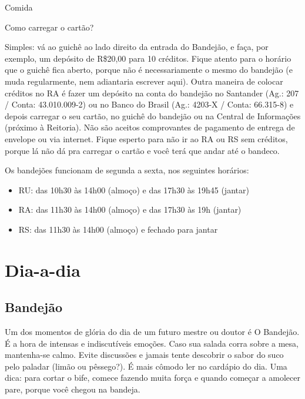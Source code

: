 
\begin{story}{Comida}

\begin{sidebar}{Como carregar o cartão?}

Simples: vá ao guichê ao lado direito da entrada do Bandejão, e faça, por exemplo, um depósito de R\$20,00 para 10 créditos. Fique atento para o horário que o guichê fica aberto, porque não é necessariamente o mesmo do bandejão (e muda regularmente, nem adiantaria escrever aqui). Outra maneira de colocar créditos no RA é fazer um depósito na conta do bandejão no Santander (Ag.: 207 / Conta: 43.010.009-2) ou no Banco do Brasil (Ag.: 4203-X / Conta: 66.315-8) e depois carregar o seu cartão, no guichê do bandejão ou na Central de Informações (próximo à Reitoria). Não são aceitos comprovantes de pagamento de entrega de envelope ou via internet. Fique esperto para não ir ao RA ou RS sem créditos, porque lá não dá pra carregar o cartão e você terá que andar até o bandeco.

Os bandejões funcionam de segunda a sexta, nos seguintes horários:

\begin{itemize}
\item RU: das 10h30 às 14h00 (almoço) e das 17h30 às 19h45 (jantar)
\item RA: das 11h30 às 14h00 (almoço) e das 17h30 às 19h (jantar)
\item RS: das 11h30 às 14h00 (almoço) e fechado para jantar
\end{itemize}

\end{sidebar}

\section*{Dia-a-dia}

\subsection*{Bandejão}

Um dos momentos de glória do dia de um futuro mestre ou doutor é O Bandejão. É a hora de intensas e indiscutíveis emoções. Caso sua salada corra sobre a mesa, mantenha-se calmo. Evite discussões e jamais tente descobrir o sabor do suco pelo paladar (limão ou pêssego?). É mais cômodo ler no cardápio do dia. Uma dica: para cortar o bife, comece fazendo muita força e quando começar a amolecer pare, porque você chegou na bandeja.


\end{story}
